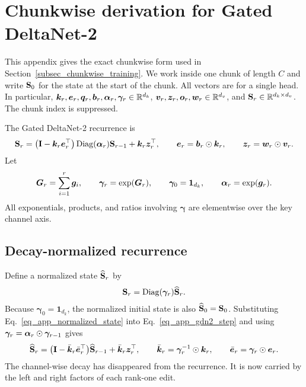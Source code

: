 \renewcommand{\thesection}{\Alph{section}}
\renewcommand\thefigure{S.\arabic{figure}}
\setcounter{figure}{0}
\renewcommand\thetable{S.\arabic{table}}
\setcounter{table}{0}

\section{Chunkwise derivation for Gated DeltaNet-2}
\label{app_wy}

This appendix gives the exact chunkwise form used in Section~\ref{subsec_chunkwise_training}. We work inside one chunk of length $C$ and write ${\mathbf{S}}_0$ for the state at the start of the chunk. All vectors are for a single head. In particular, ${\bm{k}}_r,{\bm{e}}_r,{\bm{q}}_r,{\bm{b}}_r,{\bm{\alpha}}_r,\boldsymbol{\gamma}_r\in\mathbb{R}^{d_k}$, ${\bm{v}}_r,{\bm{z}}_r,{\bm{o}}_r,{\bm{w}}_r\in\mathbb{R}^{d_v}$, and ${\mathbf{S}}_r\in\mathbb{R}^{d_k\times d_v}$. The chunk index is suppressed.

The Gated DeltaNet-2 recurrence is
\begin{align}
    {\mathbf{S}}_r
    =
    \bigl({\mathbf{I}} - {\bm{k}}_r{\bm{e}}_r^\top\bigr)
    \operatorname{Diag}({\bm{\alpha}}_r){\mathbf{S}}_{r-1}
    + {\bm{k}}_r{\bm{z}}_r^\top,
    \qquad
    {\bm{e}}_r = {\bm{b}}_r \odot {\bm{k}}_r,
    \qquad
    {\bm{z}}_r = {\bm{w}}_r \odot {\bm{v}}_r .
\label{eq_app_gdn2_step}
\end{align}
Let
\begin{align}
    \boldsymbol{G}_r = \sum_{i=1}^{r}\boldsymbol{g}_i,
    \qquad
    \boldsymbol{\gamma}_r = \exp(\boldsymbol{G}_r),
    \qquad
    \boldsymbol{\gamma}_0 = \mathbf{1}_{d_k},
    \qquad
    {\bm{\alpha}}_r = \exp(\boldsymbol{g}_r).
\label{eq_app_gamma}
\end{align}
All exponentials, products, and ratios involving $\boldsymbol{\gamma}$ are elementwise over the key channel axis.

\subsection{Decay-normalized recurrence}
\label{app_decay_normalized}

Define a normalized state $\widehat{{\mathbf{S}}}_r$ by
\begin{align}
    {\mathbf{S}}_r = \operatorname{Diag}(\boldsymbol{\gamma}_r)\widehat{{\mathbf{S}}}_r .
\label{eq_app_normalized_state}
\end{align}
Because $\boldsymbol{\gamma}_0=\mathbf{1}_{d_k}$, the normalized initial state is also $\widehat{{\mathbf{S}}}_0={\mathbf{S}}_0$. Substituting Eq.~\ref{eq_app_normalized_state} into Eq.~\ref{eq_app_gdn2_step} and using $\boldsymbol{\gamma}_r={\bm{\alpha}}_r\odot\boldsymbol{\gamma}_{r-1}$ gives
\begin{align}
    \widehat{{\mathbf{S}}}_r
    =
    \bigl({\mathbf{I}} - \bar{{\bm{k}}}_r\bar{{\bm{e}}}_r^\top\bigr)
    \widehat{{\mathbf{S}}}_{r-1}
    + \bar{{\bm{k}}}_r{\bm{z}}_r^\top,
    \qquad
    \bar{{\bm{k}}}_r = \boldsymbol{\gamma}_r^{-1}\odot{\bm{k}}_r,
    \qquad
    \bar{{\bm{e}}}_r = \boldsymbol{\gamma}_r\odot{\bm{e}}_r .
\label{eq_app_normalized_recurrence}
\end{align}
The channel-wise decay has disappeared from the recurrence. It is now carried by the left and right factors of each rank-one edit.

